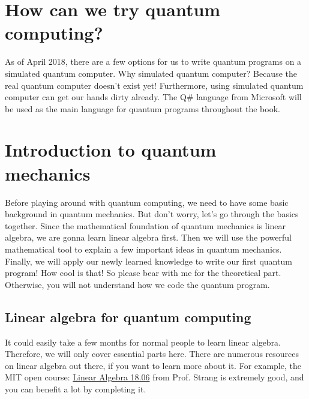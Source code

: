 \section{\textbf{How} can we try quantum computing?}

\begin{fullwidth}

As of April 2018, there are a few options for us to write quantum programs on a simulated quantum computer.
Why simulated quantum computer? Because the real quantum computer doesn't exist yet!
Furthermore, using simulated quantum computer can get our hands dirty already.
The Q\# language from Microsoft will be used as the main language for quantum programs throughout the book.

\end{fullwidth}

\section{Introduction to quantum mechanics}

\begin{fullwidth}

Before playing around with quantum computing, we need to have some basic background in quantum mechanics.
But don't worry, let's go through the basics together.
Since the mathematical foundation of quantum mechanics is linear algebra, we are gonna learn linear algebra first.
Then we will use the powerful mathematical tool to explain a few important ideas in quantum mechanics.
Finally, we will apply our newly learned knowledge to write our first quantum program!
How cool is that!
So please bear with me for the theoretical part.
Otherwise, you will not understand how we code the quantum program.

\end{fullwidth}

\subsection{Linear algebra for quantum computing}
It could easily take a few months for normal people to learn linear algebra.
Therefore, we will only cover essential parts here.
There are numerous resources on linear algebra out there, if you want to learn more about it.
For example, the MIT open course: \href{https://ocw.mit.edu/courses/mathematics/18-06-linear-algebra-spring-2010/}{Linear Algebra 18.06} from Prof. Strang\cite{Chapter1-mit-linear-algebra} is extremely good, and you can benefit a lot by completing it.

